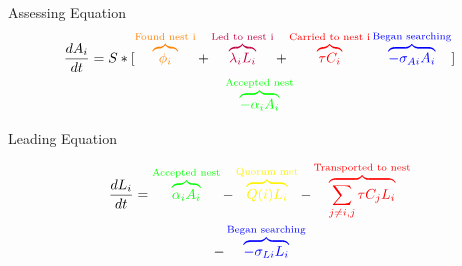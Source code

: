 \documentclass{beamer}
\makeatletter
\def\mcolor#1#{\@mcolor{#1}}
\def\@mcolor#1#2#3{%
  \protect\leavevmode
  \begingroup
    \color#1{#2}#3%
  \endgroup
}
\newcommand{\annotate}[3]{
\mcolor{#1}{\overbrace{#3}^\text{#2}}
}
\makeatother
\begin{document}
\begin{frame}{Assessing Equation}
\begin{multline}
\frac{dA_i}{dt} = S * [\annotate{orange}{Found nest i}{\phi_i} + \annotate{purple}{Led to nest i}{\lambda_iL_i} + \annotate{red}{Carried to nest i}{\tau C_i}   
\annotate{blue}{Began searching}{- \sigma_{Ai}A_i}] \\
    \annotate{green}{Accepted nest}{- \alpha_iA_i}
\end{multline}

% 

\end{frame}

\begin{frame}{Leading Equation}

\begin{multline}
    \frac{dL_i}{dt} = \annotate{green}{Accepted nest}{\alpha_iA_i} - \annotate{yellow}{Quorum met}{Q(i)L_i} - \annotate{red}{Transported to nest}{\sum_{j \neq i, j} \tau C_jL_i} \\ 
    - \annotate{blue}{Began searching}{- \sigma_{Li}L_i}
\end{multline}

\end{frame}
\end{document}
